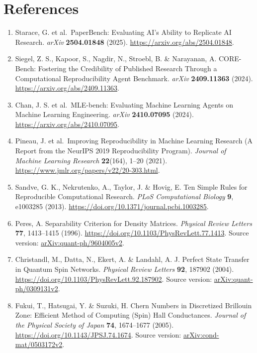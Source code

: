 \documentclass[10pt,a4paper]{article}
\begin{document}
\section*{References}\label{references}

\begin{enumerate}
\def\labelenumi{\arabic{enumi}.}
\item
  Starace, G. et al.~PaperBench: Evaluating AI's Ability to Replicate AI
  Research. \emph{arXiv} \textbf{2504.01848} (2025).
  \url{https://arxiv.org/abs/2504.01848}.
\item
  Siegel, Z. S., Kapoor, S., Nagdir, N., Stroebl, B. \& Narayanan, A.
  CORE-Bench: Fostering the Credibility of Published Research Through a
  Computational Reproducibility Agent Benchmark. \emph{arXiv}
  \textbf{2409.11363} (2024). \url{https://arxiv.org/abs/2409.11363}.
\item
  Chan, J. S. et al.~MLE-bench: Evaluating Machine Learning Agents on
  Machine Learning Engineering. \emph{arXiv} \textbf{2410.07095} (2024).
  \url{https://arxiv.org/abs/2410.07095}.
\item
  Pineau, J. et al.~Improving Reproducibility in Machine Learning
  Research (A Report from the NeurIPS 2019 Reproducibility Program).
  \emph{Journal of Machine Learning Research} \textbf{22}(164), 1--20
  (2021). \url{https://www.jmlr.org/papers/v22/20-303.html}.
\item
  Sandve, G. K., Nekrutenko, A., Taylor, J. \& Hovig, E. Ten Simple
  Rules for Reproducible Computational Research. \emph{PLoS
  Computational Biology} \textbf{9}, e1003285 (2013).
  \url{https://doi.org/10.1371/journal.pcbi.1003285}.
\item
  Peres, A. Separability Criterion for Density Matrices. \emph{Physical
  Review Letters} \textbf{77}, 1413--1415 (1996).
  \url{https://doi.org/10.1103/PhysRevLett.77.1413}. Source version:
  \href{https://arxiv.org/abs/quant-ph/9604005v2}{arXiv:quant-ph/9604005v2}.
\item
  Christandl, M., Datta, N., Ekert, A. \& Landahl, A. J. Perfect State
  Transfer in Quantum Spin Networks. \emph{Physical Review Letters}
  \textbf{92}, 187902 (2004).
  \url{https://doi.org/10.1103/PhysRevLett.92.187902}. Source version:
  \href{https://arxiv.org/abs/quant-ph/0309131v2}{arXiv:quant-ph/0309131v2}.
\item
  Fukui, T., Hatsugai, Y. \& Suzuki, H. Chern Numbers in Discretized
  Brillouin Zone: Efficient Method of Computing (Spin) Hall
  Conductances. \emph{Journal of the Physical Society of Japan}
  \textbf{74}, 1674--1677 (2005).
  \url{https://doi.org/10.1143/JPSJ.74.1674}. Source version:
  \href{https://arxiv.org/abs/cond-mat/0503172v2}{arXiv:cond-mat/0503172v2}.
\end{enumerate}
\end{document}

